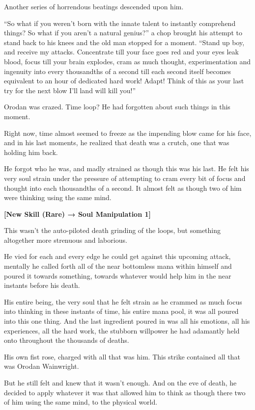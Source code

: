 \documentclass[a4paper,10pt]{book}
\begin{document}
Another series of horrendous beatings descended upon him.\par
“So what if you weren’t born with the innate talent to instantly comprehend things? So what if you aren’t a natural genius?” a chop brought his attempt to stand back to his knees and the old man stopped for a moment. “Stand up boy, and receive my attacks. Concentrate till your face goes red and your eyes leak blood, focus till your brain explodes, cram as much thought, experimentation and ingenuity into every thousandths of a second till each second itself becomes equivalent to an hour of dedicated hard work! Adapt! Think of this as your last try for the next blow I’ll land will kill you!”\par
Orodan was crazed. Time loop? He had forgotten about such things in this moment.\par
Right now, time almost seemed to freeze as the impending blow came for his face, and in his last moments, he realized that death was a crutch, one that was holding him back.\par
He forgot who he was, and madly strained as though this was his last. He felt his very soul strain under the pressure of attempting to cram every bit of focus and thought into each thousandths of a second. It almost felt as though two of him were thinking using the same mind.\par
\textbf{[New Skill (Rare) → Soul Manipulation 1]}\par
This wasn’t the auto-piloted death grinding of the loops, but something altogether more strenuous and laborious.\par
He vied for each and every edge he could get against this upcoming attack, mentally he called forth all of the near bottomless mana within himself and poured it towards something, towards whatever would help him in the near instants before his death.\par
His entire being, the very soul that he felt strain as he crammed as much focus into thinking in these instants of time, his entire mana pool, it was all poured into this one thing. And the last ingredient poured in was all his emotions, all his experiences, all the hard work, the stubborn willpower he had adamantly held onto throughout the thousands of deaths.\par
His own fist rose, charged with all that was him. This strike contained all that was Orodan Wainwright.\par
But he still felt and knew that it wasn’t enough. And on the eve of death, he decided to apply whatever it was that allowed him to think as though there two of him using the same mind, to the physical world.\par
\end{document}

